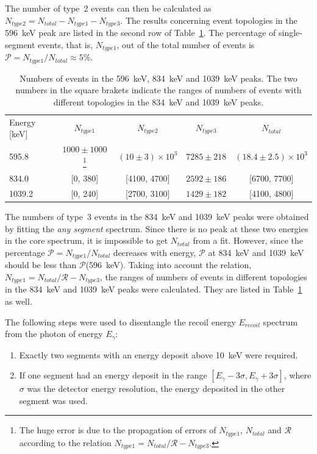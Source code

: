 The number of type~2 events can then be calculated as $N_{type2} = N_{total} - N_{type1} - N_{type3}$. The results concerning event topologies in the 596~keV peak are listed in the second row of Table~\ref{tab:neu:ncore}. The percentage of single-segment events, that is, $N_{type1}$, out of the total number of events is $\mathcal{P} = N_{type1} / N_{total} \approx 5\%$.
\begin{table}[tbhp]
  \caption{Numbers of events in the 596~keV, 834~keV and 1039~keV
    peaks.    The two numbers in the square brakets indicate the     ranges of    numbers     of events with different topologies in     the     834~keV and 1039~keV    peaks.}
  \label{tab:neu:ncore}\centering
  \begin{minipage}{\textwidth}\centering
    \begin{tabular*}{\textwidth}{lcccc} \hline\noalign{\smallskip}
      Energy [keV]& $N_{type 1}$ & $N_{type 2}$  & $N_{type 3}$    &
$N_{total}$   \\
      \noalign{\smallskip}\hline\noalign{\smallskip} 595.8 &
      $1000 \pm 1000$ \footnote{The huge error is due to the
        propagation of errors of $N_{type1}$, $N_{total}$ and
        $\mathcal{R}$ according to the relation $N_{type1} = N_{total}
        / \mathcal{R} - N_{type3}$.}
      & $(10 \pm 3)\times10^3$ & $7285 \pm 218$ & $(18.4 \pm
2.5)\times10^3$ \\
      834.0  & [0, 380]    & [4100, 4700] & $2592 \pm 186$ & [6700,
7700] \\
      1039.2 & [0, 240]    & [2700, 3100] & $1429 \pm 182$ & [4100,
4800] \\
    \end{tabular*}
  \end{minipage}
\end{table}

The numbers of type~3 events in the 834~keV and 1039~keV peaks were obtained by fitting the \emph{any segment} spectrum. Since there is no peak at these two energies in the core spectrum, it is impossible to get $N_{total}$ from a fit. However, since the percentage $\mathcal{P} = N_{type1} / N_{total}$ decreases with energy, $\mathcal{P}$ at 834~keV and 1039~keV should be less than $\mathcal{P}$(596~keV). Taking into account the relation, $N_{type1} = N_{total}/\mathcal{R} - N_{type3}$, the ranges of numbers of events in different topologies in the 834~keV and 1039~keV peaks were calculated. They are listed in Table~\ref{tab:neu:ncore} as well.

The following steps were used to disentangle the recoil energy $E_{recoil}$ spectrum from the photon of energy $E_\gamma$:
\begin{enumerate}
\item Exactly two segments with an energy deposit above 10~keV were   required.
\item If one segment had an energy deposit in the range   $[E_\gamma-3\sigma, E_\gamma+3\sigma]$, where $\sigma$ was the   detector energy resolution, the energy deposited in the other   segment was used.
\end{enumerate}


